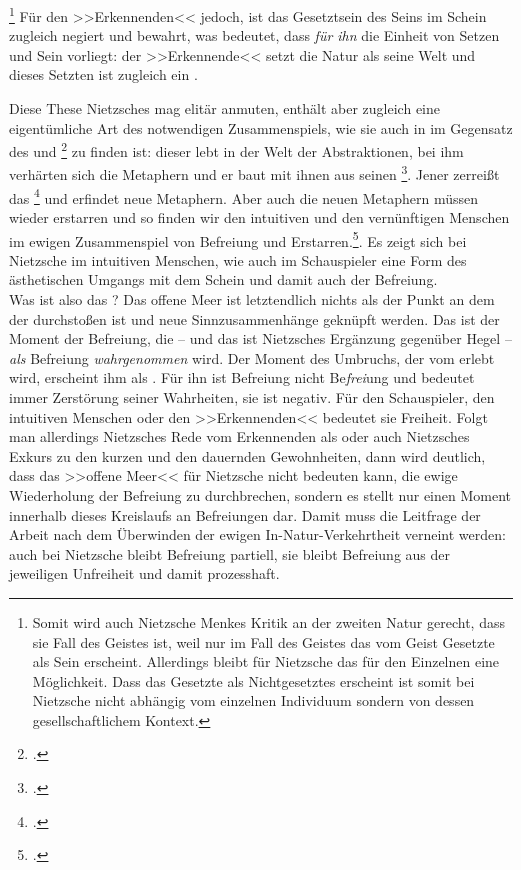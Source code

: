 \documentclass[12pt, a4paper, openany]{report}
\begin{document}
\footnote{
    Somit wird auch Nietzsche Menkes Kritik an der zweiten Natur gerecht, dass sie Fall des Geistes ist, weil nur im Fall des Geistes das vom Geist Gesetzte als Sein erscheint. 
    Allerdings bleibt für Nietzsche das für den Einzelnen eine Möglichkeit. 
    Dass das Gesetzte als Nichtgesetztes erscheint ist somit bei Nietzsche nicht abhängig vom einzelnen Individuum sondern von dessen gesellschaftlichem Kontext.
} 
Für den >>Erkennenden<< jedoch, ist das Gesetztsein des Seins im Schein zugleich negiert und bewahrt, was bedeutet, dass \emph{für ihn} die Einheit von Setzen und Sein vorliegt:
der >>Erkennende<< setzt die Natur als seine Welt und dieses Setzten ist zugleich ein . 

Diese These Nietzsches mag elitär anmuten, enthält aber zugleich eine eigentümliche Art des notwendigen Zusammenspiels, wie sie auch in  im Gegensatz des  und \footcite[][889]{nietzsche_geburt_1999} zu finden ist: 
dieser lebt in der Welt der Abstraktionen, bei ihm verhärten sich die Metaphern und er baut mit ihnen aus  seinen \footcite[][S. 882ff.]{nietzsche_geburt_1999}.
Jener zerreißt das \footcite[][S. 877ff.]{nietzsche_geburt_1999} und erfindet neue Metaphern.
Aber auch die neuen Metaphern müssen wieder erstarren und so finden wir den intuitiven und den vernünftigen Menschen im ewigen Zusammenspiel von Befreiung und Erstarren.\footcite[Vergleiche dazu auch: ][62]{stephan_nietzscheanismus_2019}.
Es zeigt sich bei Nietzsche im intuitiven Menschen, wie auch im Schauspieler eine Form des ästhetischen Umgangs mit dem Schein und damit auch der Befreiung. 
\\

Was ist also das ?
Das offene Meer ist letztendlich nichts als der Punkt an dem der  durchstoßen ist und neue Sinnzusammenhänge geknüpft werden. 
Das  ist der Moment der Befreiung, die -- und das ist Nietzsches Ergänzung gegenüber Hegel -- \emph{als} Befreiung \emph{wahrgenommen} wird.
Der Moment des Umbruchs, der vom  erlebt wird, erscheint ihm als .
Für ihn ist Befreiung nicht Be\-\emph{frei}\-ung und bedeutet immer Zerstörung seiner Wahrheiten, sie ist negativ. 
Für den Schauspieler, den intuitiven Menschen oder den >>Erkennenden<< bedeutet sie Freiheit.
Folgt man allerdings Nietzsches Rede vom Erkennenden als  oder auch Nietzsches Exkurs zu den kurzen und den dauernden Gewohnheiten, dann wird deutlich, dass das >>offene Meer<< für Nietzsche nicht bedeuten kann, die ewige Wiederholung der Befreiung zu durchbrechen, sondern es stellt nur einen Moment innerhalb dieses Kreislaufs an Befreiungen dar. 
Damit muss die Leitfrage der Arbeit nach dem Überwinden der ewigen In-Natur-Verkehrtheit verneint werden:
auch bei Nietzsche bleibt Befreiung partiell, sie bleibt Befreiung aus der jeweiligen Unfreiheit und damit prozesshaft.
\end{document}

